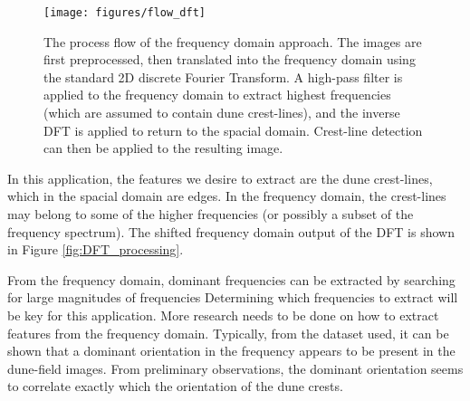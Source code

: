  \begin{figure}[H]
 	\centering
 	\texttt{[image: figures/flow\_dft]}
 	\caption{The process flow of the frequency domain approach. The images are first preprocessed, then translated into the frequency domain using the standard 2D discrete Fourier Transform. A high-pass filter is applied to the frequency domain to extract highest frequencies (which are assumed to contain dune crest-lines), and the inverse DFT is applied to return to the spacial domain. Crest-line detection can then be applied to the resulting image. }
 	\label{fig:flow_dft}
 \end{figure}

In this application, the features we desire to extract are the dune crest-lines, which in the spacial domain are edges. In the frequency domain, the crest-lines may belong to some of the higher frequencies (or possibly a subset of the frequency spectrum). The shifted frequency domain output of the DFT is shown in Figure \ref{fig:DFT_processing}.

From the frequency domain, dominant frequencies can be extracted by searching for large magnitudes of frequencies Determining which frequencies to extract will be key for this application. More research needs to be done on how to extract features from the frequency domain. Typically, from the dataset used, it can be shown that a dominant orientation in the frequency appears to be present in the dune-field images. From preliminary observations, the dominant orientation seems to correlate exactly which the orientation of the dune crests.

